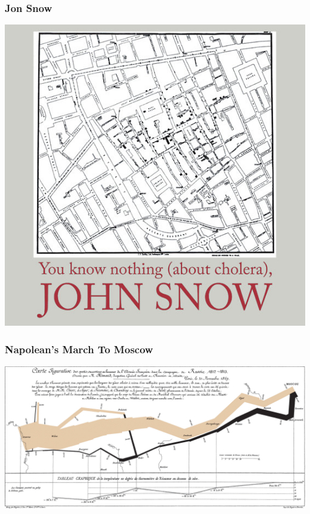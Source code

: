 \documentclass{beamer} %
\begin{document}
\begin{frame}\frametitle{Jon Snow}
		\centering
	\includegraphics[width=0.8\linewidth]{jonsnow.jpg}
\end{frame}


\begin{frame}\frametitle{Napolean's March To Moscow}
		\centering
	\includegraphics[width=\linewidth]{Minard.png}
	
\end{frame}
\end{document}
